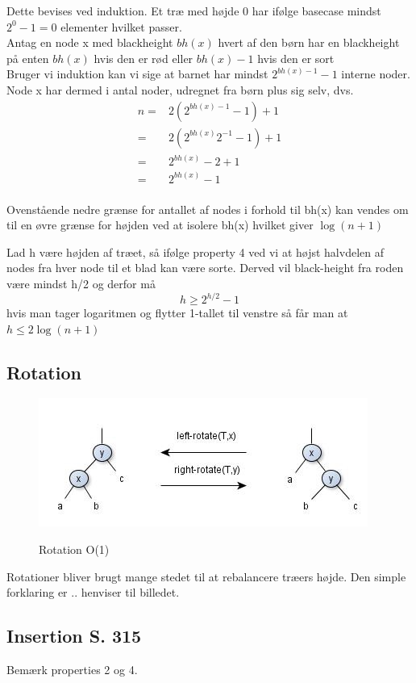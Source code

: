 \documentclass[11pt,a4paper]{report}
\theoremstyle{plain}
\theoremstyle{definition}
\theoremstyle{remark}
\numberwithin{equation}{section}
\begin{document}
Dette bevises ved induktion. Et træ med højde 0 har ifølge basecase mindst $2^0 - 1 = 0$ elementer hvilket passer.\\
Antag en node x med blackheight $bh(x)$ hvert af den børn har en blackheight på enten $bh(x)$ hvis den er rød eller $bh(x)-1$ hvis den er sort\\
Bruger vi induktion kan vi sige at barnet har mindst $2^{bh(x)-1}-1$ interne noder. Node x har dermed i antal noder, udregnet fra børn plus sig selv, dvs.
\begin{align*}
  n  =& 2(2^{bh(x)-1}-1) +1 \\
     =& 2(2^{bh(x)}2^{-1}-1) +1 \\
     =& 2^{bh(x)} - 2 +1 \\
     =& 2^{bh(x)} - 1 \\
\end{align*}

Ovenstående nedre grænse for antallet af nodes i forhold til bh(x) kan vendes om til en øvre grænse for højden ved at isolere bh(x) hvilket giver $\log(n+1)$

Lad h være højden af træet, så ifølge property 4 ved vi at højst halvdelen af nodes fra hver node til et blad kan være sorte. Derved vil black-height fra roden være mindst h/2 og derfor må
\[
h \geq 2^{h/2}-1
\]
hvis man tager logaritmen og flytter 1-tallet til venstre så får man at $h \leq 2 \log(n+1)$

\subsection{Rotation}
\begin{figure}[H]
  \centering
  \includegraphics[scale=1]{rota.jpg}\\
  \caption{Rotation O(1)}
\end{figure}
Rotationer bliver brugt  mange stedet til at rebalancere træers højde. Den simple forklaring er .. henviser til billedet.


\subsection{Insertion  S. 315}
Bemærk properties 2 og 4.
\end{document}
